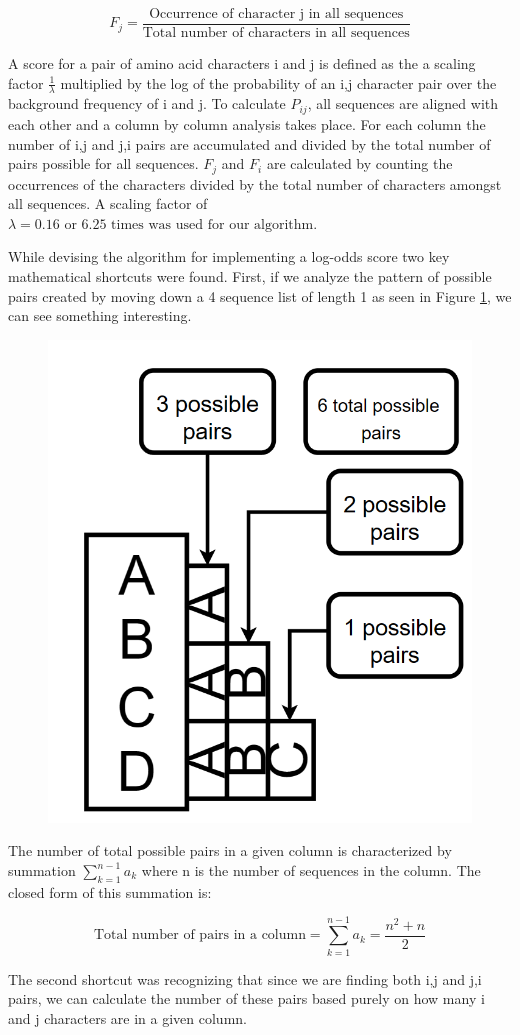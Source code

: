 \documentclass[a4paper,11pt]{article}
\begin{document}
\begin{equation}
	\label{eq:prob-frequencyj}
	{F_{j}} = \frac{\text{Occurrence of character j in all sequences}} {\text{Total number of characters in all sequences}}
\end{equation}


A score for a pair of amino acid characters i and j is defined as the a scaling factor $\frac{1}{\lambda}$ multiplied by the log of the probability of an i,j character pair over the background frequency of i and j. To calculate ${P_{ij}}$, all sequences are aligned with each other and a column by column analysis takes place. For each column the number of i,j and j,i pairs are accumulated and divided by the total number of pairs possible for all sequences.  ${F_{j}}$ and ${F_{i}}$ are calculated by counting the occurrences of the characters divided by the total number of characters amongst all sequences. A scaling factor of $\lambda = 0.16 \text{ or } 6.25 \text{ times was used for our algorithm.}$

While devising the algorithm for implementing a log-odds score two key mathematical shortcuts were found. First, if we analyze the pattern of possible pairs created by moving down a 4 sequence list of length 1 as seen in Figure \ref{fig:screenshot001}, we can see something interesting. 

\begin{figure}[h]
	\centering
	\includegraphics[width=0.25\linewidth]{screenshot001}
	\caption{}
	\label{fig:screenshot001}
\end{figure}

The number of total possible pairs in a given column is characterized by summation $\sum_{k=1}^{n-1} a_k$ where n is the number of sequences in the column. The closed form of this summation is:

\begin{equation}
	\label{eq:closed form}
	{\text{Total number of pairs in a column} = \sum_{k=1}^{n-1} a_k} =\frac{n^{2} + n}{2}
\end{equation}

The second shortcut was recognizing that since we are finding both i,j and j,i pairs, we can calculate the number of these pairs based purely on how many i and j characters are in a given column. 
\end{document}
